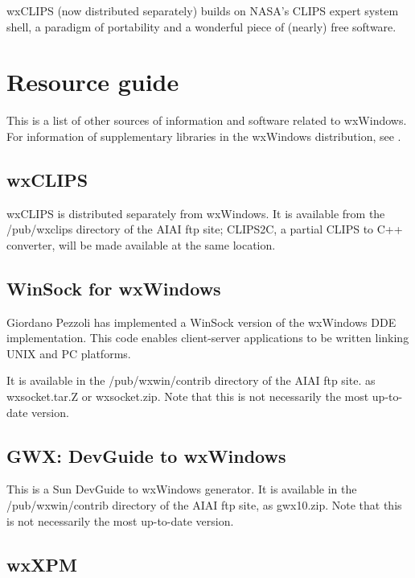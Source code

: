 wxCLIPS (now distributed separately) builds on NASA's CLIPS expert
system shell, a paradigm of portability and a wonderful piece of
(nearly) free software.

\chapter{Resource guide}\label{resguide}
%
\setfooter{\thepage}{}{}{}{}{\thepage}%

This is a list of other sources of information and software
related to wxWindows. For information of supplementary libraries in
the wxWindows distribution, see .

\section{wxCLIPS}

wxCLIPS is distributed separately from wxWindows. It is available
from the /pub/wxclips directory of the AIAI ftp site; CLIPS2C,
a partial CLIPS to C++ converter, will be made available at the
same location.

\section{WinSock for wxWindows}

Giordano Pezzoli has implemented a WinSock version of the
wxWindows DDE implementation. This code enables client-server
applications to be written linking UNIX and PC platforms.

It is available in the /pub/wxwin/contrib directory of the AIAI ftp
site. as wxsocket.tar.Z or wxsocket.zip. Note that this is not
necessarily the most up-to-date version.

\section{GWX: DevGuide to wxWindows}\label{gwx}

This is a Sun DevGuide to wxWindows generator. It is available in the
/pub/wxwin/contrib directory of the AIAI ftp site, as gwx10.zip.
Note that this is not necessarily the most up-to-date
version.

\section{wxXPM}

